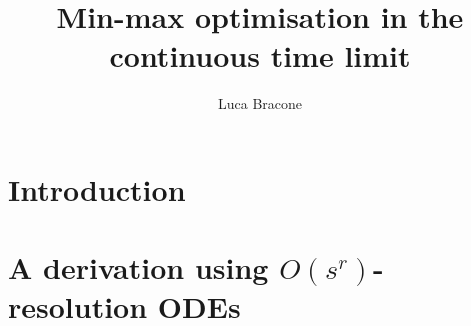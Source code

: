 \documentclass{scrreprt}
\title{Min-max optimisation in the continuous time limit}
\author{Luca Bracone}
\theoremstyle{remark}
\begin{document}
\maketitle

\chapter{Introduction}

\chapter{A derivation using $O(s^r)$-resolution ODEs}




\end{document}
